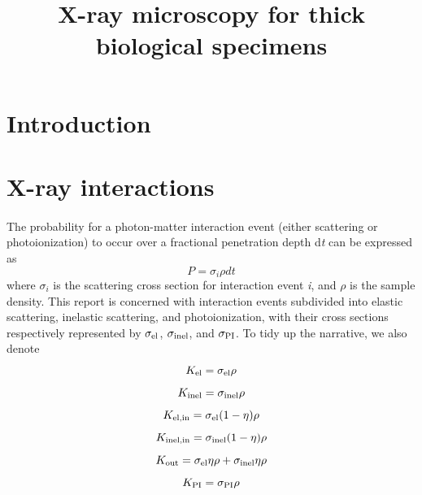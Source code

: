 \documentclass[]{article}
\title{X-ray microscopy for thick biological specimens}
\newcommand\el{\textup{\scriptsize{el}}}
\newcommand\inel{\textup{\scriptsize{inel}}}
\newcommand\elin{\textup{\scriptsize{el,in}}}
\newcommand\inelin{\textup{\scriptsize{inel,in}}}
\newcommand\out{\textup{\scriptsize{out}}}
\newcommand\PI{\textup{\scriptsize{PI}}}
\begin{document}
\maketitle

\begin{abstract}

\end{abstract}

\section{Introduction}

\section{X-ray interactions}

\paragraph{} The probability for a photon-matter interaction event (either scattering or photoionization) to occur over a fractional penetration depth d\textit{t} can be expressed as
\begin{equation}
P = \sigma_{i} \rho dt
\end{equation}
where $\sigma_{i}$ is the scattering cross section for interaction event \textit{i}, and $\rho$ is the sample density. This report is concerned with interaction events subdivided into elastic scattering, inelastic scattering, and photoionization, with their cross sections respectively represented by $\sigma_{\el}$, $\sigma_{\inel}$, and $\sigma_{\PI}$. To tidy up the narrative, we also denote
\begin{equation}
K_{\el} = \sigma_{\el}\rho
\end{equation}
\begin{equation}
K_{\inel} = \sigma_{\inel}\rho
\end{equation}
\begin{equation}
K_{\elin} = \sigma_{\el}(1-\eta)\rho
\end{equation}
\begin{equation}
K_{\inelin} = \sigma_{\inel}(1-\eta)\rho
\label{eq:inelin}
\end{equation}
\begin{equation}
K_{\out} = \sigma_{\el}\eta\rho + \sigma_{\inel}\eta\rho
\end{equation}
\begin{equation}
K_{\PI} = \sigma_{\PI}\rho
\end{equation}
\end{document}
